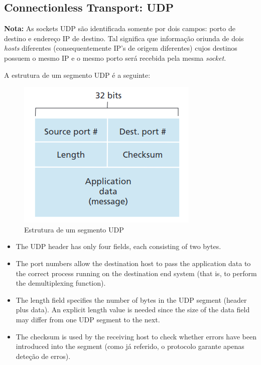 \clearpage
\subsection[3.3 Connectionless Transport: UDP]{\hspace*{0.075 em}\raisebox{0.2 em}{$\pmb{\drsh}$} Connectionless Transport: UDP}
\label{subsec:UDP}

\noindent \textbf{Nota:} As sockets UDP são identificada somente por dois campos: porto de destino e endereço IP de destino. Tal significa que informação oriunda de dois \textit{hosts} diferentes (consequentemente IP's de origem diferentes) cujos destinos possuem o mesmo IP e o mesmo porto será recebida pela mesma \textit{socket}.

\vspace{1 em}
\noindent A estrutura de um segmento UDP é a seguinte:

\begin{figure}[H]
    \centering
    \includegraphics[width = 0.5\linewidth]{img/3/UDP-segment.png}
    \caption{Estrutura de um segmento UDP}
    \label{fig:seg-UDP}
\end{figure}

\begin{itemize}
    \item The UDP header has only four fields, each consisting of two bytes.
    \item The port numbers allow the destination host to pass the application data to the correct process running on the destination end system (that is, to perform the demultiplexing function).
    \item The length field specifies the number of bytes in the UDP segment (header plus data). An explicit length value is needed since the size of the data field may differ from one UDP segment to the next.
    \item The checksum is used by the receiving host to check whether errors have been introduced into the segment (como já referido, o protocolo garante apenas deteção de erros).
\end{itemize} 

